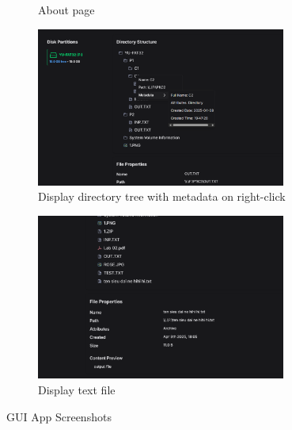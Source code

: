 \documentclass[a4paper,12pt]{report}
\begin{document}
\begin{figure}[!ht]
\begin{subfigure}{0.42\textwidth}
        \caption{About page}
    \end{subfigure}
    \hfill
    \begin{subfigure}{0.42\textwidth}
        \centering
        \includegraphics[width=0.9\textwidth]{../public/screenshots/dir.png}
        \caption{Display directory tree with metadata on right-click}
    \end{subfigure}
    \hfill
    \begin{subfigure}{0.42\textwidth}
        \centering
        \includegraphics[width=0.9\textwidth]{../public/screenshots/file-content.png}
        \caption{Display text file}
    \end{subfigure}
    \caption{GUI App Screenshots}
\end{figure}
\end{document}
